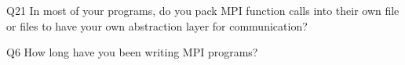 \begin{description}%
\item{Q21} In most of your programs, do you pack MPI function calls into their own file or files to have your own abstraction layer for communication?%
\item{Q6} How long have you been writing MPI programs?%
\end{description}%
